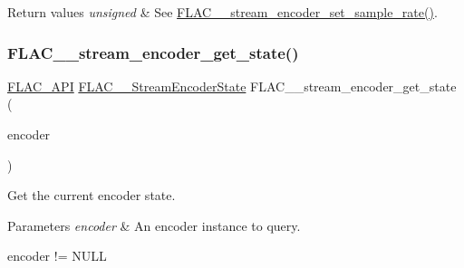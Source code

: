 \begin{DoxyRetVals}{Return values}
{\em unsigned} & See \hyperlink{group__flac__stream__encoder_ga108c3f4fbdcaa744ddbb125f91cb3838}{F\+L\+A\+C\+\_\+\+\_\+stream\+\_\+encoder\+\_\+set\+\_\+sample\+\_\+rate()}. \\
\hline
\end{DoxyRetVals}
\mbox{\label{group__flac__stream__encoder_gaff7284e55f01b59ed8f03317df510992}} 
\subsubsection{\texorpdfstring{F\+L\+A\+C\+\_\+\+\_\+stream\+\_\+encoder\+\_\+get\+\_\+state()}{FLAC\_\_stream\_encoder\_get\_state()}}
{\footnotesize\ttfamily \hyperlink{group__flac__export_ga56ca07df8a23310707732b1c0007d6f5}{F\+L\+A\+C\+\_\+\+A\+PI} \hyperlink{group__flac__stream__encoder_gac5e9db4fc32ca2fa74abd9c8a87c02a5}{F\+L\+A\+C\+\_\+\+\_\+\+Stream\+Encoder\+State} F\+L\+A\+C\+\_\+\+\_\+stream\+\_\+encoder\+\_\+get\+\_\+state (\begin{DoxyParamCaption}\item[{\hyperlink{zconf_8h_a2c212835823e3c54a8ab6d95c652660e}{const} \hyperlink{struct_f_l_a_c_____stream_encoder}{F\+L\+A\+C\+\_\+\+\_\+\+Stream\+Encoder} $\ast$}]{encoder }\end{DoxyParamCaption})}

Get the current encoder state.


\begin{DoxyParams}{Parameters}
{\em encoder} & An encoder instance to query.  
\begin{DoxyCode}
encoder != NULL 
\end{DoxyCode}
 \\
\hline
\end{DoxyParams}

